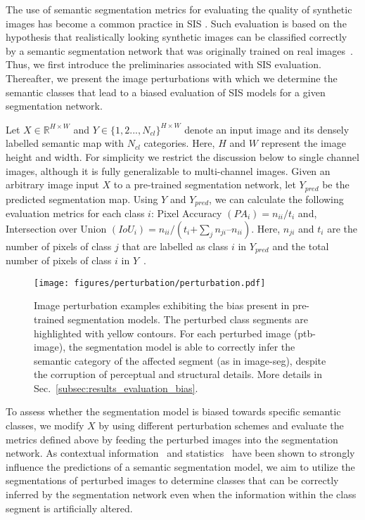 \documentclass[final]{cvpr}
\newcommand\+{\mkern4mu}
\begin{document}
The use of semantic segmentation metrics for evaluating the quality of synthetic images has become a common practice in SIS \cite{isola2017image,wang2018high,park2019semantic,liu2019learning}. Such evaluation is based on the hypothesis that realistically looking synthetic images can be classified correctly by a semantic segmentation network that was originally trained on real images~\cite{isola2017image}. Thus, we first introduce the preliminaries associated with SIS evaluation. Thereafter, we present the image perturbations with which we determine the semantic classes that lead to a biased evaluation of SIS models for a given segmentation network.

Let \(X \in \mathbb{R}^{H \times W}\) and \(Y \in \{1, 2..., N_{cl}\}^{H \times W}\) denote an input image and its densely labelled semantic map with $N_{cl}$ categories. Here, $H$ and $W$ represent the image height and width. For simplicity we restrict the discussion below to single channel images, although it is fully generalizable to multi-channel images. Given an arbitrary image input $X$ to a pre-trained segmentation network, let $Y_{pred}$ be the predicted segmentation map. Using $Y$ and $Y_{pred}$, we can calculate the following evaluation metrics for each class $i$: Pixel Accuracy \((PA_i) = n_{ii}/t_{i}\) and, Intersection over Union $(IoU_i) = n_{ii}/(t_{i} \text{+} \sum_{j} n_{ji} \text{--} n_{ii})$. Here, $n_{ji}$ and $t_i$ are the number of pixels of class $j$ that are labelled as class $i$ in $Y_{pred}$ and the total number of pixels of class $i$ in $Y$~\cite{long2015fully}.

\begin{figure*}[t]
	\begin{center}
	\texttt{[image: figures/perturbation/perturbation.pdf]}
	\end{center}
	\vspace{-0.5em}
	\caption{Image perturbation examples exhibiting the bias present in pre-trained segmentation models. The perturbed class segments are highlighted with yellow contours. For each perturbed image (ptb-image), the segmentation model is able to correctly infer the semantic category of the affected segment (as in image-seg), despite the corruption of perceptual and structural details. More details in Sec.~\ref{subsec:results_evaluation_bias}.}
	\label{fig:perturbation}
	\vspace{-1em}
\end{figure*}  
To assess whether the segmentation model is biased towards specific semantic classes, we modify $X$ by using different perturbation schemes and evaluate the metrics defined above by feeding the perturbed images into the segmentation network. As contextual information~\cite{hoyer2019grid,mottaghi2014role} and statistics~\cite{wang2016learnable} have been shown to strongly influence the predictions of a semantic segmentation model, we aim to utilize the segmentations of perturbed images to determine classes that can be correctly inferred by the segmentation network even when the information within the class segment is artificially altered. 
\end{document}
